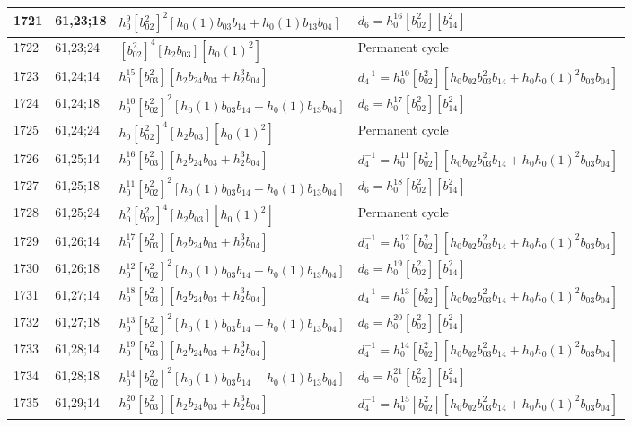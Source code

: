 \documentclass{article}
\begin{document}
\begin{longtable}{|l|l|>{\raggedright\arraybackslash}p{6cm}|>{\raggedright\arraybackslash}p{6cm}|}
\hline
1721 & 61,23;18 & $h_0^9[b_{02}^2]^2[h_0(1)b_{03}b_{14} + h_0(1)b_{13}b_{04}]$ &$d_{6}=h_0^{16}[b_{02}^2][b_{14}^2]$\\
\hline
1722 & 61,23;24 & $[b_{02}^2]^4[h_2b_{03}][h_0(1)^2]$ & Permanent cycle\\
\hline
1723 & 61,24;14 & $h_0^{15}[b_{03}^2][h_2b_{24}b_{03} + h_2^3b_{04}]$ & $d_{4}^{-1}=h_0^{10}[b_{02}^2][h_0b_{02}b_{03}^2b_{14} + h_0h_0(1)^2b_{03}b_{04}]$\\
\hline
1724 & 61,24;18 & $h_0^{10}[b_{02}^2]^2[h_0(1)b_{03}b_{14} + h_0(1)b_{13}b_{04}]$ &$d_{6}=h_0^{17}[b_{02}^2][b_{14}^2]$\\
\hline
1725 & 61,24;24 & $h_0[b_{02}^2]^4[h_2b_{03}][h_0(1)^2]$ & Permanent cycle\\
\hline
1726 & 61,25;14 & $h_0^{16}[b_{03}^2][h_2b_{24}b_{03} + h_2^3b_{04}]$ & $d_{4}^{-1}=h_0^{11}[b_{02}^2][h_0b_{02}b_{03}^2b_{14} + h_0h_0(1)^2b_{03}b_{04}]$\\
\hline
1727 & 61,25;18 & $h_0^{11}[b_{02}^2]^2[h_0(1)b_{03}b_{14} + h_0(1)b_{13}b_{04}]$ &$d_{6}=h_0^{18}[b_{02}^2][b_{14}^2]$\\
\hline
1728 & 61,25;24 & $h_0^2[b_{02}^2]^4[h_2b_{03}][h_0(1)^2]$ & Permanent cycle\\
\hline
1729 & 61,26;14 & $h_0^{17}[b_{03}^2][h_2b_{24}b_{03} + h_2^3b_{04}]$ & $d_{4}^{-1}=h_0^{12}[b_{02}^2][h_0b_{02}b_{03}^2b_{14} + h_0h_0(1)^2b_{03}b_{04}]$\\
\hline
1730 & 61,26;18 & $h_0^{12}[b_{02}^2]^2[h_0(1)b_{03}b_{14} + h_0(1)b_{13}b_{04}]$ &$d_{6}=h_0^{19}[b_{02}^2][b_{14}^2]$\\
\hline
1731 & 61,27;14 & $h_0^{18}[b_{03}^2][h_2b_{24}b_{03} + h_2^3b_{04}]$ & $d_{4}^{-1}=h_0^{13}[b_{02}^2][h_0b_{02}b_{03}^2b_{14} + h_0h_0(1)^2b_{03}b_{04}]$\\
\hline
1732 & 61,27;18 & $h_0^{13}[b_{02}^2]^2[h_0(1)b_{03}b_{14} + h_0(1)b_{13}b_{04}]$ &$d_{6}=h_0^{20}[b_{02}^2][b_{14}^2]$\\
\hline
1733 & 61,28;14 & $h_0^{19}[b_{03}^2][h_2b_{24}b_{03} + h_2^3b_{04}]$ & $d_{4}^{-1}=h_0^{14}[b_{02}^2][h_0b_{02}b_{03}^2b_{14} + h_0h_0(1)^2b_{03}b_{04}]$\\
\hline
1734 & 61,28;18 & $h_0^{14}[b_{02}^2]^2[h_0(1)b_{03}b_{14} + h_0(1)b_{13}b_{04}]$ &$d_{6}=h_0^{21}[b_{02}^2][b_{14}^2]$\\
\hline
1735 & 61,29;14 & $h_0^{20}[b_{03}^2][h_2b_{24}b_{03} + h_2^3b_{04}]$ & $d_{4}^{-1}=h_0^{15}[b_{02}^2][h_0b_{02}b_{03}^2b_{14} + h_0h_0(1)^2b_{03}b_{04}]$\\

\end{longtable}
\end{document}

